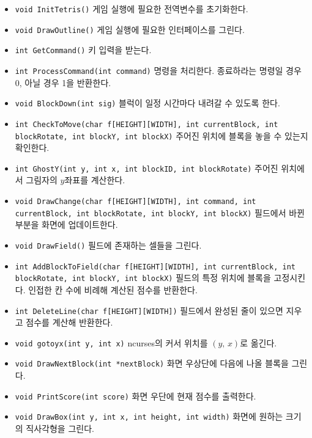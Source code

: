 \begin{itemize}
    \item \texttt{void InitTetris()}
    게임 실행에 필요한 전역변수를 초기화한다.
    \item \texttt{void DrawOutline()}
    게임 실행에 필요한 인터페이스를 그린다.
    \item \texttt{int GetCommand()}
    키 입력을 받는다.
    \item \texttt{int ProcessCommand(int command)}
    명령을 처리한다. 종료하라는 명령일 경우 0, 아닐 경우 1을 반환한다.
    \item \texttt{void BlockDown(int sig)}
    블럭이 일정 시간마다 내려갈 수 있도록 한다.
    \item \texttt{int CheckToMove(char f[HEIGHT][WIDTH], int currentBlock, int blockRotate, int blockY, int blockX)}
    주어진 위치에 블록을 놓을 수 있는지 확인한다.
    \item \texttt{int GhostY(int y, int x, int blockID, int blockRotate)}
    주어진 위치에서 그림자의 $y$좌표를 계산한다.
    \item \texttt{void DrawChange(char f[HEIGHT][WIDTH], int command, int currentBlock, int blockRotate, int blockY, int blockX)}
    필드에서 바뀐 부분을 화면에 업데이트한다.
    \item \texttt{void DrawField()}
    필드에 존재하는 셀들을 그린다.
    \item \texttt{int AddBlockToField(char f[HEIGHT][WIDTH], int currentBlock, int blockRotate, int blockY, int blockX)}
    필드의 특정 위치에 블록을 고정시킨다. 인접한 칸 수에 비례해 계산된 점수를 반환한다.
    \item \texttt{int DeleteLine(char f[HEIGHT][WIDTH])}
    필드에서 완성된 줄이 있으면 지우고 점수를 계산해 반환한다.
    \item \texttt{void gotoyx(int y, int x)}
    ncurses의 커서 위치를 $\left(y,\,x\right)$로 옮긴다.
    \item \texttt{void DrawNextBlock(int *nextBlock)}
    화면 우상단에 다음에 나올 블록을 그린다.
    \item \texttt{void PrintScore(int score)}
    화면 우단에 현재 점수를 출력한다.
    \item \texttt{void DrawBox(int y, int x, int height, int width)}
    화면에 원하는 크기의 직사각형을 그린다.

\end{itemize}
